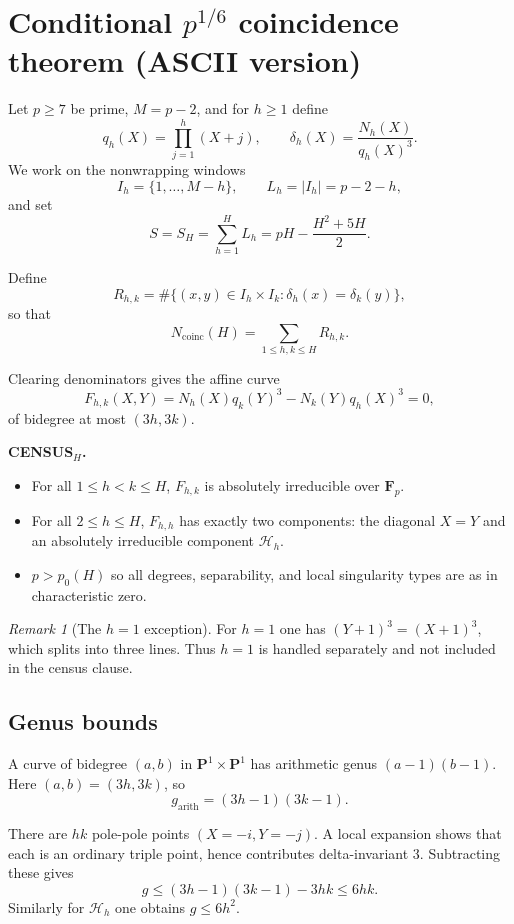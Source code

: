 \documentclass[11pt]{article}
\theoremstyle{remark}
\newtheorem{remark}[theorem]{Remark}
\newcommand{\Fp}{\mathbf F_p}
\newcommand{\Ncoinc}{N_{\mathrm{coinc}}}
\begin{document}
\section*{Conditional $p^{1/6}$ coincidence theorem (ASCII version)}

Let $p \ge 7$ be prime, $M = p-2$, and for $h \ge 1$ define
\[
q_h(X) = \prod_{j=1}^h (X+j), \qquad
\delta_h(X) = \frac{N_h(X)}{q_h(X)^3}.
\]
We work on the nonwrapping windows
\[
I_h = \{1,\dots,M-h\}, \qquad L_h = |I_h| = p-2-h,
\]
and set
\[
S = S_H = \sum_{h=1}^H L_h = pH - \frac{H^2+5H}{2}.
\]

Define
\[
R_{h,k} = \#\{(x,y)\in I_h \times I_k : \delta_h(x) = \delta_k(y)\},
\]
so that
\[
\Ncoinc(H) = \sum_{1 \le h,k \le H} R_{h,k}.
\]

Clearing denominators gives the affine curve
\[
F_{h,k}(X,Y) = N_h(X) q_k(Y)^3 - N_k(Y) q_h(X)^3 = 0,
\]
of bidegree at most $(3h,3k)$.

\medskip

\noindent
\textbf{CENSUS$_H$.}
\begin{itemize}
\item For all $1 \le h < k \le H$, $F_{h,k}$ is absolutely irreducible over $\Fp$.
\item For all $2 \le h \le H$, $F_{h,h}$ has exactly two components:
the diagonal $X=Y$ and an absolutely irreducible component $\mathcal H_h$.
\item $p > p_0(H)$ so all degrees, separability, and local singularity types
are as in characteristic zero.
\end{itemize}

\begin{remark}[The $h=1$ exception]
For $h=1$ one has $(Y+1)^3 = (X+1)^3$, which splits into three lines.
Thus $h=1$ is handled separately and not included in the census clause.
\end{remark}

\subsection*{Genus bounds}

A curve of bidegree $(a,b)$ in $\mathbf P^1 \times \mathbf P^1$ has arithmetic genus $(a-1)(b-1)$.
Here $(a,b) = (3h,3k)$, so
\[
g_{\mathrm{arith}} = (3h-1)(3k-1).
\]

There are $hk$ pole-pole points $(X=-i, Y=-j)$.
A local expansion shows that each is an ordinary triple point,
hence contributes delta-invariant $3$.
Subtracting these gives
\[
g \le (3h-1)(3k-1) - 3hk \le 6hk.
\]
Similarly for $\mathcal H_h$ one obtains $g \le 6h^2$.
\end{document}
